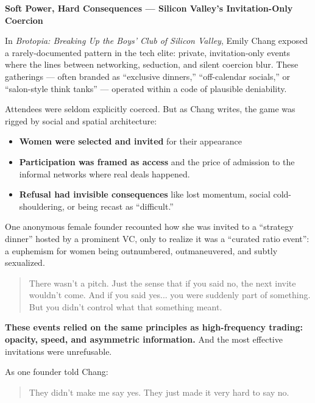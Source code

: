 \begin{HistoricalSidebar}{\textbf{Soft Power, Hard Consequences --- Silicon Valley's Invitation-Only Coercion}}

    In \textit{Brotopia: Breaking Up the Boys’ Club of Silicon Valley}, Emily Chang exposed a rarely-documented 
    pattern in the tech elite: private, invitation-only events where the lines between networking, seduction, and 
    silent coercion blur. These gatherings --- often branded as ``exclusive dinners,'' ``off-calendar socials,''
    or ``salon-style think tanks'' --- operated within a code of plausible deniability.
    
    \medskip
    
    Attendees were seldom explicitly coerced. But as Chang writes, the game was rigged by social and spatial 
    architecture:

    \medskip
    
    
    \begin{itemize}
        \item \textbf{Women were selected and invited} for their appearance
        \item \textbf{Participation was framed as access} and the price of admission to the informal networks 
        where real deals happened.
        \item \textbf{Refusal had invisible consequences} like lost momentum, social cold-shouldering, or being recast 
        as “difficult.”
    \end{itemize}
    
    \medskip
    
    One anonymous female founder recounted how she was invited to a ``strategy dinner'' hosted by a prominent VC, 
    only to realize it was a ``curated ratio event'': a euphemism for women being outnumbered, outmaneuvered, 
    and subtly sexualized.
    
    \begin{quote}
        There wasn’t a pitch. Just the sense that if you said no, the next invite wouldn’t come. 
        And if you said yes... you were suddenly part of something. But you didn’t control what 
        that something meant.
    \end{quote}
    
    \medskip
    
    \textbf{These events relied on the same principles as 
    high-frequency trading: opacity, speed, and asymmetric information.} And the most effective invitations 
    were unrefusable.
    
    \medskip
    
    As one founder told Chang:
    
    \begin{quote}
        They didn’t make me say yes. They just made it very hard to say no.
    \end{quote}
    
\end{HistoricalSidebar}

